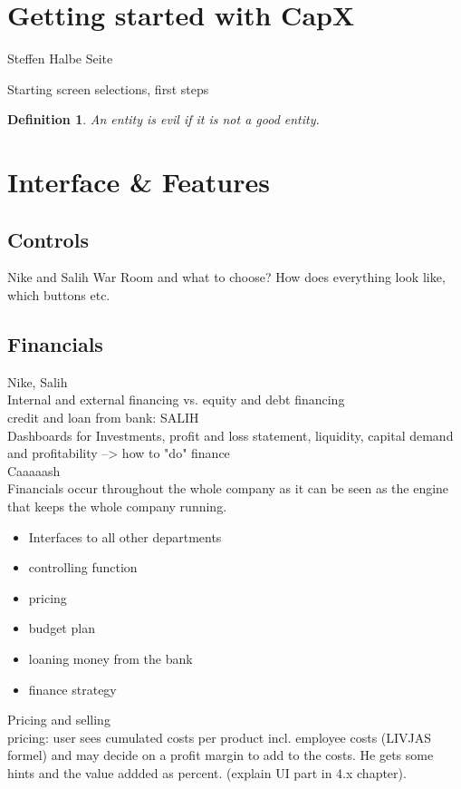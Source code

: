 \documentclass[11pt,titlepage,oneside,openany]{book}
\newtheorem{definition}{Definition}
\begin{document}
\section{Getting started with CapX}
Steffen
Halbe Seite

\label{sec:prelim}
Starting screen selections, first steps
\begin{definition}
\label{def:evil}
An entity is evil if it is not a good entity.
\end{definition}

\section{Interface \& Features}
\label{sec:good}

\subsection{Controls}  
Nike and Salih
War Room and what to choose? How does everything look like, which buttons etc.
\subsection{Financials}
Nike, Salih\\
Internal and external financing vs. equity and debt financing\\
credit and loan from bank: SALIH \\
Dashboards for Investments, profit and loss statement, liquidity, capital demand and profitability --> how to "do" finance \\
Caaaaash\\
Financials occur throughout the whole company as it can be seen as the engine that keeps the whole company running. 
\begin{itemize}
    \item Interfaces to all other departments
    \item controlling function
    \item pricing 
    \item budget plan
    \item loaning money from the bank
    \item finance strategy
\end{itemize}

Pricing and selling \\
pricing: user sees cumulated costs per product incl. employee costs (LIVJAS formel) and may decide on a profit margin to add to the costs. He gets some hints and the value addded as percent. (explain UI part in 4.x chapter).
\end{document}
